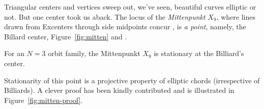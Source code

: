Triangular centers and vertices sweep out, we've seen, beautiful curves elliptic or not. But one center took us aback. The locus of the {\em Mittenpunkt} $X_9$, where lines drawn from Excenters through side midpoints concur \cite{mw}, is {\em a point}, namely, the Billard center, Figure~\ref{fig:mitten} and \cite[video \#3]{dsr_main_videos_2019}.

\begin{theorem}
For an $N=3$ orbit family, the Mittenpunkt $X_9$ is stationary at the Billiard's center.
\end{theorem}

Stationarity of this point is a projective property of elliptic chords (irrespective of Billiards). A clever proof has been kindly contributed \cite{olga19_mitten} and is illustrated in Figure~\ref{fig:mitten-proof}. 


